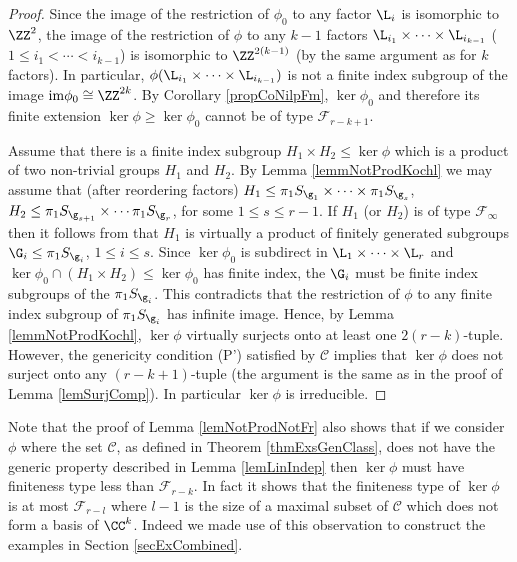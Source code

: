 \begin{proof}
 Since the image of the restriction of $\phi_0$ to any factor $\L_i$ is isomorphic to $\ZZ^2$, the image of the restriction of $\phi$ to any $k-1$ factors $\L_{i_1}\times \cdots \times \L_{i_{k-1}}$ ($1\leq i_1 < \cdots < i_{k-1}$) is isomorphic to $\ZZ^{2(k-1)}$ (by the same argument as for $k$ factors). In particular, $\phi(\L_{i_1}\times \cdots \times \L_{i_{k-1}})$ is not a finite index subgroup of the image ${\rm{im}} \phi_0\cong \ZZ^{2k}$. By Corollary \ref{propCoNilpFm}, $\ker \phi_0$ and therefore its finite extension $\ker \phi \geq \ker \phi_0$ cannot be of type $\mathcal{F}_{r-k+1}$. 
 
 Assume that there is a finite index subgroup $H_1 \times H_2 \leq \ker \phi$ which is a product of two non-trivial groups $H_1$ and $H_2$. By Lemma \ref{lemmNotProdKochl} we may assume that (after reordering factors) $H_1 \leq \pi_1 S_{\g_1} \times \cdots \times \pi_1 S_{\g_s}$, $H_2 \leq \pi_1 S_{\g_{s+1}}\times \cdots \pi_1 S_{\g_r}$, for some $1\leq s \leq r-1$. If $H_1$ (or $H_2$) is of type $\mathcal{F}_{\infty}$ then it follows from \cite[Theorem A]{BriHowMilSho-09} that $H_1$ is virtually a product of finitely generated subgroups $\G_i \leq \pi_1 S_{\g_i}$, $1\leq i \leq s$. Since $\ker \phi_0$ is subdirect in $\L_1 \times \cdots \times \L_r$ and $\ker \phi_0 \cap (H_1\times H_2)\leq \ker \phi_0$ has finite index, the $\G_i$ must be finite index subgroups of the $\pi_1 S_{\g_i}$. This contradicts that the restriction of $\phi$ to any finite index subgroup of $\pi_1 S_{\g_i}$ has infinite image. Hence, by Lemma \ref{lemmNotProdKochl}, $\ker \phi$ virtually surjects onto at least one $2(r-k)$-tuple. However, the genericity condition (P') satisfied by $\mathcal{C}$ implies that $\ker \phi$ does not surject onto any $(r-k+1)$-tuple (the argument is the same as in the proof of Lemma \ref{lemSurjComp}). In particular $\ker \phi$ is irreducible.
\end{proof}

\begin{addendum}
 Note that the proof of Lemma \ref{lemNotProdNotFr} also shows that if we consider $\phi$ where the set $\mathcal{C}$, as defined in Theorem \ref{thmExsGenClass}, does not have the generic property described in Lemma \ref{lemLinIndep} then $\ker \phi$ must have finiteness type less than $\mathcal{F}_{r-k}$. In fact it shows that the finiteness type of $\ker \phi$ is at most $\mathcal{F}_{r-l}$ where $l-1$ is the size of a maximal subset of $\mathcal{C}$ which does not form a basis of $\CC^k$. Indeed we made use of this observation to construct the examples in Section \ref{secExCombined}.
 \label{addFinPropVary}
\end{addendum}





